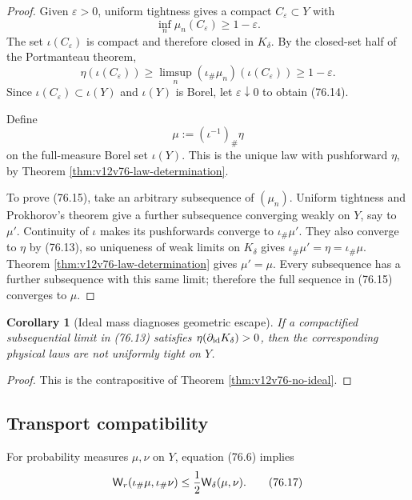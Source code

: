 \documentclass[11pt]{article}
\newtheorem{corollary}[theorem]{Corollary}
\theoremstyle{remark}
\begin{document}
\begin{proof}
Given \(\varepsilon>0\), uniform tightness gives a compact
\(C_\varepsilon\subset Y\) with
\[
                         \inf_n\mu_n(C_\varepsilon)
                         \geq1-\varepsilon.
\]
The set \(\iota(C_\varepsilon)\) is compact and therefore closed in
\(K_\delta\).  By the closed-set half of the Portmanteau theorem,
\[
 \eta(\iota(C_\varepsilon))
 \geq\limsup_n
 (\iota_\#\mu_n)(\iota(C_\varepsilon))
 \geq1-\varepsilon.                                        \tag{76.16}
\]
Since \(\iota(C_\varepsilon)\subset\iota(Y)\) and
\(\iota(Y)\) is Borel, let \(\varepsilon\downarrow0\) to obtain
(76.14).

Define
\[
 \mu:=(\iota^{-1})_\#\eta
\]
on the full-measure Borel set \(\iota(Y)\).  This is the unique law
with pushforward \(\eta\), by Theorem
\ref{thm:v12v76-law-determination}.

To prove (76.15), take an arbitrary subsequence of \((\mu_n)\).
Uniform tightness and Prokhorov's theorem give a further subsequence
converging weakly on \(Y\), say to \(\mu'\).  Continuity of \(\iota\)
makes its pushforwards converge to \(\iota_\#\mu'\).  They also
converge to \(\eta\) by (76.13), so uniqueness of weak limits on
\(K_\delta\) gives
\(\iota_\#\mu'=\eta=\iota_\#\mu\).  Theorem
\ref{thm:v12v76-law-determination} gives \(\mu'=\mu\).
Every subsequence has a further subsequence with this same limit;
therefore the full sequence in (76.15) converges to \(\mu\).
\end{proof}

\begin{corollary}[Ideal mass diagnoses geometric escape]
\label{cor:v12v76-escape}
If a compactified subsequential limit in (76.13) satisfies
\(\eta(\partial_{\rm id}K_\delta)>0\), then the corresponding
physical laws are not uniformly tight on \(Y\).
\end{corollary}

\begin{proof}
This is the contrapositive of Theorem
\ref{thm:v12v76-no-ideal}.
\end{proof}

\subsection{Transport compatibility}

For probability measures \(\mu,\nu\) on \(Y\), equation (76.6)
implies
\begin{equation}
 {\mathsf W}_r(\iota_\#\mu,\iota_\#\nu)
 \leq{1\over2}{\mathsf W}_\delta(\mu,\nu).                   \tag{76.17}
\end{equation}
\end{document}
